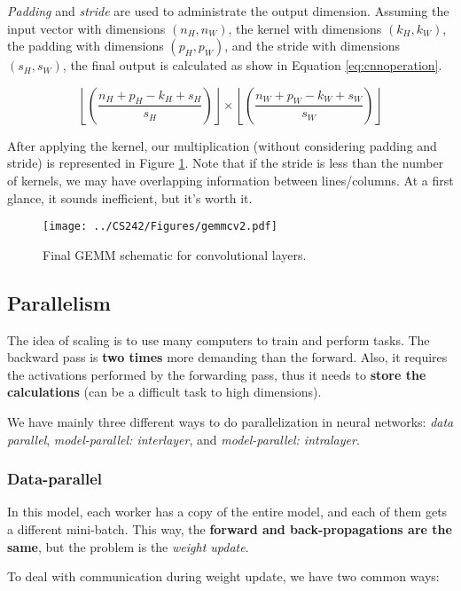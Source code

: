 \documentclass[abstract=true]{scrartcl}
\begin{document}
\emph{Padding} and \emph{stride} are used to administrate the output dimension. Assuming the input vector with dimensions $(n_H, n_W)$, the kernel with dimensions $(k_H, k_W)$, the padding with dimensions $(p_H, p_W)$, and the stride with dimensions $(s_H, s_W)$, the final output is calculated as show in Equation \ref{eq:cnnoperation}.

\begin{equation}
\left \lfloor \left(\frac{n_H + p_H - k_H + s_H}{s_H}\right)\right \rfloor \times \left \lfloor \left(\frac{n_W + p_W - k_W + s_W}{s_W}\right)\right \rfloor    
\label{eq:cnnoperation}
\end{equation}

After applying the kernel, our multiplication (without considering padding and stride) is represented in Figure \ref{fig:gemmcv2}. Note that if the stride is less than the number of kernels, we may have overlapping information between lines/columns.
At a first glance, it sounds inefficient, but it's worth it.
\begin{figure}
    \centering
    \texttt{[image: ../CS242/Figures/gemmcv2.pdf]}
    \caption{Final GEMM schematic for convolutional layers.}
    \label{fig:gemmcv2}
\end{figure}

\subsection{Parallelism}

The idea of scaling is to use many computers to train and perform tasks. The backward pass is \textbf{two times} more demanding than the forward. Also, it requires the activations performed by the forwarding pass, thus it needs to \textbf{store the calculations} (can be a difficult task to high dimensions).

We have mainly three different ways to do parallelization in neural networks: \emph{data parallel}, \emph{model-parallel: interlayer}, and \emph{model-parallel: intralayer}.

\subsubsection{Data-parallel}
In this model, each worker has a copy of the entire model, and each of them gets a different mini-batch. This way, the \textbf{forward and back-propagations are the same}, but the problem is the \emph{weight update}.

To deal with communication during weight update, we have two common ways:
\end{document}
